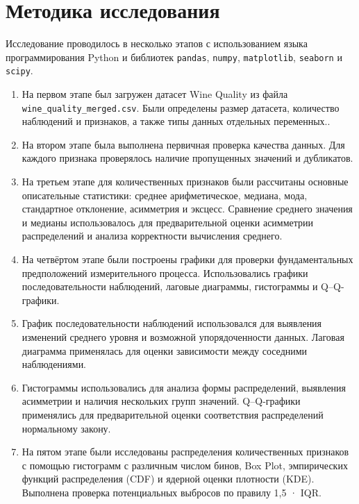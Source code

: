 \section*{\normalfont Методика исследования}

Исследование проводилось в несколько этапов с использованием языка
программирования Python и библиотек \texttt{pandas}, \texttt{numpy},
\texttt{matplotlib}, \texttt{seaborn} и \texttt{scipy}.
 
\begin{enumerate}
    \item На первом этапе был загружен датасет Wine Quality из файла \texttt{wine\_quality\_merged.csv}.
    Были определены размер датасета, количество наблюдений и признаков, а также типы данных отдельных переменных..

    \item На втором этапе была выполнена первичная проверка качества
    данных. Для каждого признака проверялось наличие пропущенных
    значений и дубликатов.

    \item На третьем этапе для количественных признаков были рассчитаны основные описательные статистики: среднее арифметическое, медиана, мода, стандартное отклонение, асимметрия и эксцесс. Сравнение среднего значения и медианы использовалось для предварительной оценки асимметрии распределений и анализа корректности вычисления среднего.

    \item На четвёртом этапе были построены графики для проверки
    фундаментальных предположений измерительного процесса. Использовались
    графики последовательности наблюдений, лаговые диаграммы,
    гистограммы и Q--Q-графики.

    \item График последовательности наблюдений использовался для выявления изменений среднего уровня и возможной упорядоченности данных. Лаговая диаграмма применялась для оценки зависимости между соседними наблюдениями.

    \item Гистограммы использовались для анализа формы распределений, выявления асимметрии и наличия нескольких групп значений. Q–Q-графики применялись для предварительной оценки соответствия распределений нормальному закону.

    \item На пятом этапе были исследованы распределения количественных признаков с помощью гистограмм с различным числом бинов, Box Plot, эмпирических функций распределения (CDF) и ядерной оценки плотности (KDE). Выполнена проверка потенциальных выбросов по правилу 1,5 · IQR.
    

\end{enumerate}

